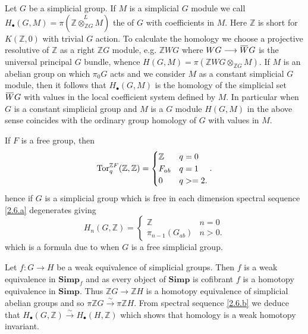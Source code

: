 \documentclass[../main]{subfiles}
\begin{document}
 Let $G$ be a simplicial group. If $M$ is a simplicial $G$ module we call $H_{\bullet } (G, M) = \pi (\mathbb{Z} \overset{L}{\otimes_{\mathbb{Z}G}} M )$ the  of $G$ with coefficients in $M$. Here $\mathbb{Z}$ is short for $K(\mathbb{Z}, 0)$ with trivial $G$ action. To calculate the homology we choose a projective resolutive of $\mathbb{Z}$ as a right $\mathbb{Z} G$ module, e.g. $\mathbb{Z} W G$ where $WG \longrightarrow  \xoverline{W} G$ is the universal principal $G$ bundle, whence $H(G, M) = \pi (\mathbb{Z} WG \otimes_{\mathbb{Z}G} M)$. If $M$ is an abelian group on which $\pi_0 G$ acts and we consider $M$ as a constant simplicial $G$ module, then it follows that $H_{\bullet }(G, M)$ is the homology of the simplicial set $\xoverline{W} G$ with values in the local coefficient system defined by $M$. In particular when $G$ is a constant simplicial group and $M$ is a $G$ module $H(G,M)$ in the above sense coincides with the ordinary group homology of $G$ with values in $M$.

If $F$ is a free group, then 
\[ 
\operatorname{Tor}_q^{\mathbb{Z}F} (\mathbb{Z}, \mathbb{Z}) = 
\begin{cases}
\mathbb{Z} & q = 0\\
F_{ab} & q = 1\\
0 & q>=2 
.\end{cases}
.\]
hence if $G$ is a simplicial group which is free in each dimension spectral sequence \ref{2.6.a} degenerates giving 
\begin{equation}\label{eq:2.6.16}\tag{16}
H_n (G, \mathbb{Z}) = \begin{cases}
\mathbb{Z} & n=0\\
\pi_{n-1} (G_{ab}) & n > 0
.\end{cases}
\end{equation}
which is a formula due to \cite{kan_css_1957} when $G$ is a free simplicial group.

Let $f \colon G \longrightarrow  H$ be a weak equivalence of simplicial groups. Then $f$ is a weak equivalence in $\mathbf{Simp}_f$ and as every object of $\mathbf{Simp}$ is cofibrant $f$ is a homotopy equivalence in $\mathbf{Simp}$. Thus $\mathbb{Z}G \longrightarrow  \mathbb{Z}H$ is a homotopy equivalence of simplicial abelian groups and so $\pi \mathbb{Z}G \overset{\sim}{\to}\pi \mathbb{Z}H$. From spectral sequence \ref{2.6.b} we deduce that $H_{\bullet } (G, \mathbb{Z}) \overset{\sim}{\to}H_{\bullet } (H, \mathbb{Z})$ which shows that homology is a weak homotopy invariant. 
\end{document}
